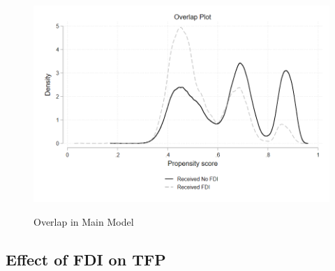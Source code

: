 \documentclass[a4paper,11pt]{scrartcl}
\begin{document}
\begin{figure}[h]\centering
	\caption{Overlap in Main Model}
	\includegraphics[width=\textwidth]{overlap}
  	\label{fig:overlap}
\end{figure} 

\subsection{Effect of FDI on TFP}

\end{document}
